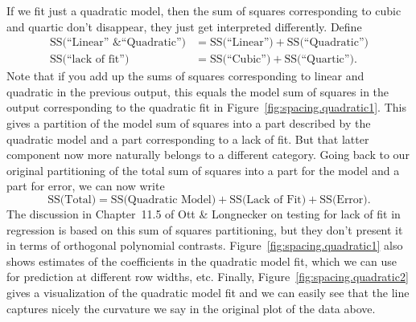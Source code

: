 \documentclass[a4paper, 12pt]{article}
\theoremstyle{plain}
\theoremstyle{definition}
\theoremstyle{remark}
\begin{document}
If we fit just a quadratic model, then the sum of squares corresponding to cubic and quartic don't disappear, they just get interpreted differently.  Define
\begin{align*}
\text{SS(``Linear'' \& ``Quadratic'')} & = \text{SS(``Linear'')} + \text{SS(``Quadratic'')} \\
\text{SS(``lack of fit'')} & = \text{SS(``Cubic'')} + \text{SS(``Quartic'')}.
\end{align*}
Note that if you add up the sums of squares corresponding to linear and quadratic in the previous output, this equals the model sum of squares in the output corresponding to the quadratic fit in Figure~\ref{fig:spacing.quadratic1}.  This gives a partition of the model sum of squares into a part described by the quadratic model and a part corresponding to a lack of fit. But that latter component now more naturally belongs to a different category.  Going back to our original partitioning of the total sum of squares into a part for the model and a part for error, we can now write 
\[ \text{SS(Total)} = \text{SS(Quadratic Model)} + \text{SS(Lack of Fit)} + \text{SS(Error)}. \]
The discussion in Chapter~11.5 of Ott \& Longnecker on testing for lack of fit in regression is based on this sum of squares partitioning, but they don't present it in terms of orthogonal polynomial contrasts.  Figure~\ref{fig:spacing.quadratic1} also shows estimates of the coefficients in the quadratic model fit, which we can use for prediction at different row widths, etc.  Finally, Figure~\ref{fig:spacing.quadratic2} gives a visualization of the quadratic model fit and we can easily see that the line captures nicely the curvature we say in the original plot of the data above.  
\end{document}
